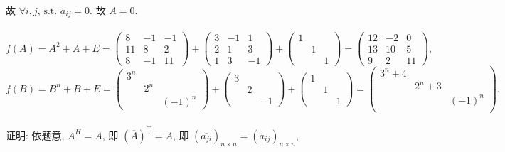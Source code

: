 		 故 $\forall i,j$, $\text{s.t. } a_{ij} = 0$. 故 $A = 0$.


	 \paragraph{} %
		 \[
			 f(A) = A^2 + A + E = \begin{pmatrix}
				 8  & -1 & -1 \\
				 11 & 8  & 2  \\
				 8  & -1 & 11
			 \end{pmatrix} + \begin{pmatrix}
				 3 & -1 & 1  \\
				 2 & 1  & 3  \\
				 1 & 3  & -1
			 \end{pmatrix} + \begin{pmatrix}
				 1 &   &   \\
				   & 1 &   \\
				   &   & 1
			 \end{pmatrix} = \begin{pmatrix}
				 12 & -2 & 0  \\
				 13 & 10 & 5  \\
				 9  & 2  & 11
			 \end{pmatrix},
		 \]
		 \[
			 f(B) = B^n + B + E = \begin{pmatrix}
				 3^n &     &        \\
				     & 2^n          \\
				     &     & (-1)^n
			 \end{pmatrix} + \begin{pmatrix}
				 3 &   &    \\
				   & 2      \\
				   &   & -1
			 \end{pmatrix} + \begin{pmatrix}
				 1 &   &   \\
				   & 1 &   \\
				   &   & 1
			 \end{pmatrix} = \begin{pmatrix}
				 3^{n}+4 &         &          \\
				         & 2^{n}+3 &          \\
				         &         & (-1)^{n} \\
			 \end{pmatrix}.
		 \]


	 \paragraph{} %
		 证明: 依题意, $A^H = A$, 即 $(\overline{A})^{\mathrm{T}} = A$, 即 $(\overline{a_{ji}})_{n \times n} = (a_{ij})_{n \times n}$,

